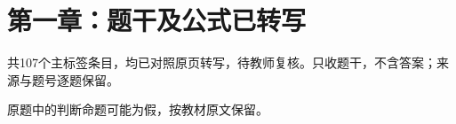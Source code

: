 

\frontmatter\chapter*{第一章：题干及公式已转写}\noindent 共107个主标签条目，均已对照原页转写，待教师复核。只收题干，不含答案；来源与题号逐题保留。\par 原题中的判断命题可能为假，按教材原文保留。\mainmatter


